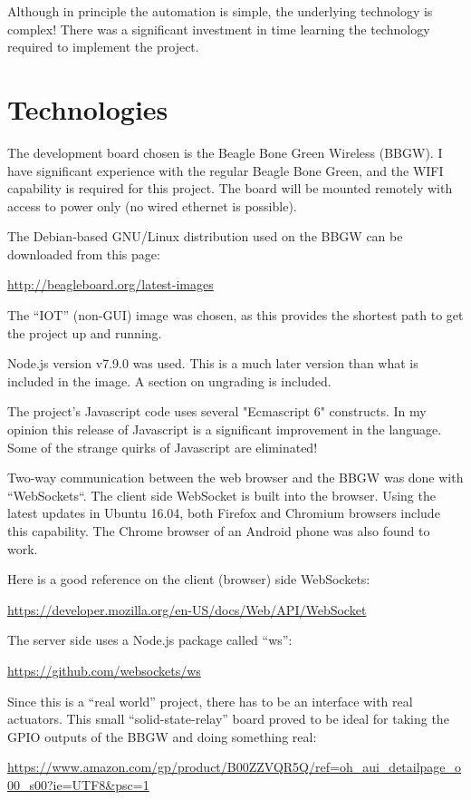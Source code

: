 Although in principle the automation is simple, the underlying technology is 
complex!  There was a significant investment in time learning the technology 
required to implement the project.

\section{Technologies}

The development board chosen is the Beagle Bone Green Wireless (BBGW).  I have 
significant experience with the regular Beagle Bone Green, and the WIFI 
capability is required for this project. The board will be mounted remotely 
with access to power only (no wired ethernet is possible).

The Debian-based GNU/Linux distribution used on the BBGW can be downloaded from 
this page:

\url{http://beagleboard.org/latest-images}

The ``IOT'' (non-GUI) image was chosen, as this provides the shortest path to 
get the project up and running.

Node.js version v7.9.0 was used.  This is a much later version than what is 
included in the image.  A section on ungrading is included.

The project's Javascript code uses several "Ecmascript 6" constructs.  In my 
opinion this release of Javascript is a significant improvement in the 
language.  Some of the strange quirks of Javascript are eliminated!

Two-way communication between the web browser and the BBGW was done with 
``WebSockets``.  The client side WebSocket is built into the browser.  Using 
the latest updates in Ubuntu 16.04, both Firefox and Chromium browsers include 
this capability.  The Chrome browser of an Android phone was also found to work.

Here is a good reference on the client (browser) side WebSockets:

\url{https://developer.mozilla.org/en-US/docs/Web/API/WebSocket}

The server side uses a Node.js package called ``ws'':

\url{https://github.com/websockets/ws}

Since this is a ``real world'' project, there has to be an interface with real 
actuators.  This small ``solid-state-relay'' board proved to be ideal for 
taking the GPIO outputs of the BBGW and doing something real:

\url{https://www.amazon.com/gp/product/B00ZZVQR5Q/ref=oh_aui_detailpage_o00_s00?ie=UTF8&psc=1}


